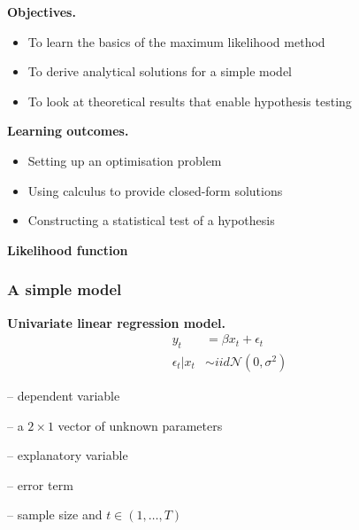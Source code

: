 \documentclass[notes,blackandwhite,mathsans]{beamer}
\begin{document}
{
\begin{frame}

\bigskip\textbf{\color{mcxs1}Objectives.}
\begin{itemize}[label=$\blacktriangleright$]
\item {\color{mcxs1}To learn the basics of the maximum likelihood method}
\item {\color{mcxs1}To derive analytical solutions for a simple model}
\item {\color{mcxs1}To look at theoretical results that enable hypothesis testing}
\end{itemize}

\bigskip\textbf{\color{mcxs3}Learning outcomes.}
\begin{itemize}[label=$\blacktriangleright$]
\item {\color{mcxs3}Setting up an optimisation problem}
\item {\color{mcxs3}Using calculus to provide closed-form solutions}
\item {\color{mcxs3}Constructing a statistical test of a hypothesis}
\end{itemize}

\end{frame}
}






{
\begin{frame}

\begin{adjustwidth}{-0.5cm}{0cm}
\vspace{8.3cm}\Large
\textbf{{\color{mcxs1}Likelihood} {\color{mcxs2}function}}
\end{adjustwidth}

\end{frame}
}




\begin{frame}
\frametitle{A simple model}

\textbf{Univariate linear regression model.}\\

\begin{align*}
y_t &= \beta x_t + \epsilon_t\\
\epsilon_t|x_t &\sim iid\mathcal{N}\left(0, \sigma^2\right)
\end{align*}

\bigskip\begin{description}\small
\item[$y_t$] {\color{mcxs3}-- dependent variable}
\item[$\theta=\left(\beta, \sigma^2\right)'$] {\color{mcxs3}-- a $2\times1$ vector of unknown parameters }
\item[$x_t$] {\color{mcxs3}-- explanatory variable}
\item[$\epsilon_t$] {\color{mcxs3}-- error term}
\item[$T$] {\color{mcxs3}-- sample size and} $t\in(1,\dots,T)$
\end{description}

\end{frame}
\end{document}
